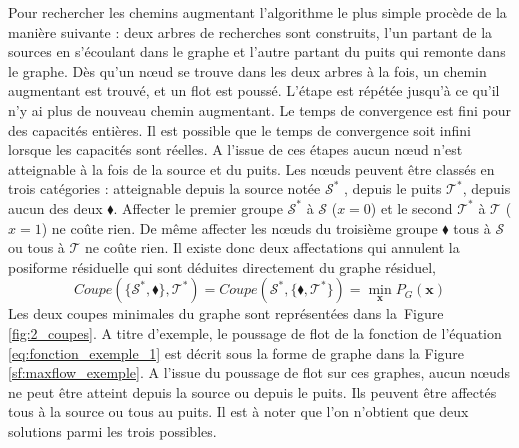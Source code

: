 \documentclass[../main/These_Mathias_Paget.tex]{subfiles}
\begin{document}
	Pour rechercher les chemins augmentant l'algorithme le plus simple procède de la manière suivante : deux arbres de recherches sont construits, l'un partant de la sources en s'écoulant dans le graphe et l'autre partant du puits qui remonte dans le graphe. Dès qu'un nœud se trouve dans les deux arbres à la fois, un chemin augmentant est trouvé, et un flot est poussé. L'étape est répétée jusqu'à ce qu'il n'y ai plus de nouveau chemin augmentant. Le temps de convergence est fini pour des capacités entières. Il est possible que le temps de convergence soit infini lorsque les capacités sont réelles. A l'issue de ces étapes aucun nœud n'est atteignable à la fois de la source et du puits. Les nœuds peuvent être classés en trois catégories : atteignable depuis la source notée $\boldsymbol{\mathcal{S}^{*}}$ , depuis le puits $\boldsymbol{\mathcal{T}^{*}}$, depuis aucun des deux $\boldsymbol{\blacklozenge}$. Affecter le premier groupe $\boldsymbol{\mathcal{S}^{*}}$ à $\boldsymbol{\mathcal{S}}$ ($x=0$) et le second $\boldsymbol{\mathcal{T}^{*}}$ à $\boldsymbol{\mathcal{T}}$ ($x=1$) ne coûte rien. De même affecter les nœuds du troisième groupe $\boldsymbol{\blacklozenge}$ tous à $\boldsymbol{\mathcal{S}}$ ou tous à $\boldsymbol{\mathcal{T}}$ ne coûte rien. Il existe donc deux affectations qui annulent la posiforme résiduelle qui sont déduites directement du graphe résiduel,
	\begin{equation}
	Coupe(\{\boldsymbol{\mathcal{S^{*}}},\boldsymbol{\blacklozenge}\},\boldsymbol{\mathcal{T^{*}}}) = Coupe(\boldsymbol{\mathcal{S^{*}}},\{\boldsymbol{\blacklozenge},\boldsymbol{\mathcal{T^{*}}}\}) = \min_{\boldsymbol{x}}{P_G(\boldsymbol{x})}	
	\end{equation}
Les deux coupes minimales du graphe sont représentées dans la~Figure \ref{fig:2_coupes}. A titre d'exemple, le poussage de flot de la fonction de l'équation \ref{eq:fonction_exemple_1} est décrit sous la forme de graphe dans la Figure \ref{sf:maxflow_exemple}. A l'issue du poussage de flot sur ces graphes, aucun nœuds ne peut être atteint depuis la source ou depuis le puits. Ils peuvent être affectés tous à la source ou tous au puits. Il est à noter que l'on n'obtient que deux solutions parmi les trois possibles.
\end{document}
